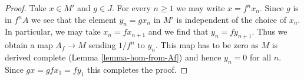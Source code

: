 \documentclass[10pt,a4paper]{amsart}
\theoremstyle{plain}
\theoremstyle{definition}
\theoremstyle{remark}
\numberwithin{equation}{subsection}
\begin{document}
\begin{proof}
Take $x \in M'$ and $g \in J$. For every $n \geq 1$ we may write
$x = f^n x_n$. Since $g$ is in $f^nA$ we see that the element
$y_n = gx_n$ in $M'$ is independent of the choice of $x_n$.
In particular, we may take $x_n = fx_{n + 1}$ and we find that
$y_n = fy_{n + 1}$. Thus we obtain a map $A_f \to M$ sending
$1/f^n$ to $y_n$. This map has to be zero as $M$ is derived complete
(Lemma \ref{lemma-hom-from-Af})
and hence $y_n = 0$ for all $n$. Since $gx = gfx_1 = fy_1$
this completes the proof.
\end{proof}
\end{document}

